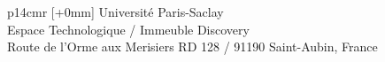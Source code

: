 \vspace{2cm} %
\selectfont
\begin{tabular}{p{14cm}r}
[+0mm]{{\color{Prune} Université Paris-Saclay\\
Espace Technologique / Immeuble Discovery\\
Route de l’Orme aux Merisiers RD 128 / 91190 Saint-Aubin, France}} %
\\
\end{tabular}









